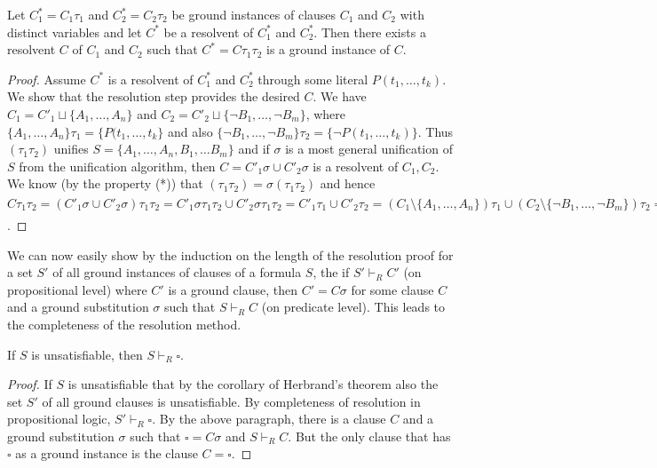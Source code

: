 \begin{lemma}[lifting]
Let $C^*_1 = C_1 \tau_1$ and $C^*_2 = C_2 \tau_2$ be ground instances of clauses $C_1$ and $C_2$ with distinct variables and let $C^*$ be a resolvent of $C^*_1$ and $C^*_2$. Then there exists a resolvent $C$ of $C_1$ and $C_2$ such that $C^* = C \tau_1 \tau_2$ is a ground instance of $C$.
\end{lemma}
\begin{proof}
Assume $C^*$ is a resolvent of $C^*_1$ and $C^*_2$ through some literal $P(t_1, \dots, t_k)$. We show that the resolution step provides the desired $C$. We have $C_1 = C'_1 \sqcup \{A_1, \dots, A_n\}$ and $C_2 = C'_2 \sqcup \{\neg B_1, \dots, \neg B_m\}$, where $\{A_1, \dots, A_n\}\tau_1 = \{P(t_1, \dots, t_k\}$ and also $\{\neg B_1, \dots, \neg B_m\}\tau_2 = \{\neg P(t_1, \dots, t_k)\}$. Thus $(\tau_1 \tau_2)$ unifies $S = \{A_1, \dots, A_n, B_1, \dots B_m\}$ and if $\sigma$ is a most general unification of $S$ from the unification algorithm, then $C = C'_1 \sigma \cup C'_2 \sigma$ is a resolvent of $C_1, C_2$. We know (by the property (*)) that $(\tau_1 \tau_2) = \sigma(\tau_1 \tau_2)$ and hence $C \tau_1 \tau_2 = (C'_1 \sigma \cup C'_2 \sigma)\tau_1 \tau_2 = C'_1 \sigma \tau_1 \tau_2 \cup C'_2 \sigma \tau_1 \tau_2 = C'_1 \tau_1 \cup C'_2 \tau_2 = (C_1 \setminus \{A_1, \dots, A_n\})\tau_1 \cup (C_2 \setminus \{\neg B_1, \dots, \neg B_m\})\tau_2 = (C^*_1 \setminus \{P(t_1, \dots, t_k\}) \cup (C^*_2 \setminus \{\neg P(t_1, \dots, t_k)\}) = C^*$. 
\end{proof}

We can now easily show by the induction on the length of the resolution proof for a set $S'$ of all ground instances of clauses of a formula $S$, the if $S' \vdash_R C'$ (on propositional level) where $C'$ is a ground clause, then $C' = C \sigma$ for some clause $C$ and a ground substitution $\sigma$ such that $S \vdash_R C$ (on predicate level). This leads to the completeness of the resolution method.

\begin{theorem}
If $S$ is unsatisfiable, then $S \vdash_R \square$.
\end{theorem}
\begin{proof}
If $S$ is unsatisfiable that by the corollary of Herbrand's theorem also the set $S'$ of all ground clauses is unsatisfiable. By completeness of resolution in propositional logic, $S' \vdash_R \square$. By the above paragraph, there is a clause $C$ and a ground substitution $\sigma$ such that $\square = C \sigma$ and $S \vdash_R C$. But the only clause that has $\square$ as a ground instance is the clause $C = \square$.
\end{proof}

